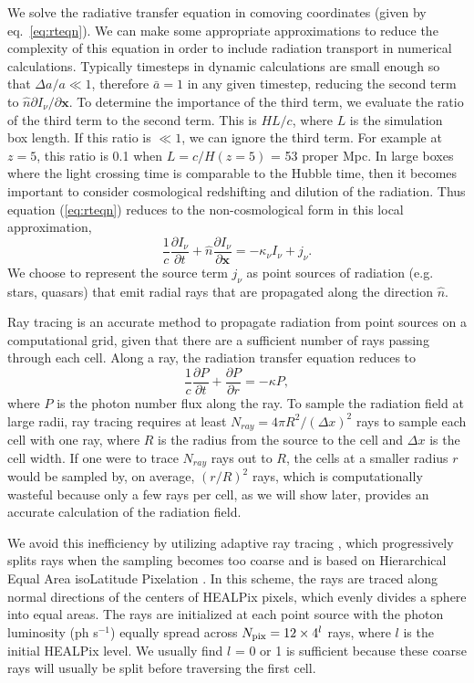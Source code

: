 We solve the radiative transfer equation in comoving coordinates (given by eq.~\ref{eq:rteqn}).
We can make some appropriate approximations to reduce the complexity
of this equation in order to include radiation transport
in numerical calculations.  Typically timesteps in dynamic
calculations are small enough so that $\Delta a/a \ll 1$, therefore
$\bar{a} = 1$ in any given timestep, reducing the second term to
$\hat{n} \partial I_\nu/\partial \mathbf{x}$.  To determine the
importance of the third term, we evaluate the ratio of the third term
to the second term.  This is $HL/c$, where $L$ is the simulation box
length.  If this ratio is $\ll 1$, we can ignore the third term.  For
example at $z=5$, this ratio is 0.1 when $L = c/H(z=5)$ = 53 proper
Mpc.  In large boxes where the light crossing time is comparable to
the Hubble time, then it becomes important to consider cosmological
redshifting and dilution of the radiation.  Thus equation
(\ref{eq:rteqn}) reduces to the non-cosmological form in this local
approximation,
%
\begin{equation}
  \frac{1}{c} \frac{\partial I_\nu}{\partial t} + 
  \hat{n} \frac{\partial I_\nu}{\partial \mathbf{x}} =
  -\kappa_\nu I_\nu + j_\nu .
\end{equation}
%
We choose to represent the source term $j_\nu$ as point sources of
radiation (e.g. stars, quasars) that emit radial rays that are
propagated along the direction $\hat{n}$.

Ray tracing is an accurate method to propagate radiation from point
sources on a computational grid, given that there are a sufficient
number of rays passing through each cell.  Along a ray, the radiation
transfer equation reduces to
%
\begin{equation}
\label{eqn:rtray}
\frac{1}{c} \frac{\partial P}{\partial t} + \frac{\partial P}{\partial
  r} = -\kappa P,
\end{equation}
where $P$ is the photon number flux along the ray.  To sample the
radiation field at large radii, ray tracing requires at least $N_{ray}
= 4\pi R^2 / (\Delta x)^2$ rays to sample each cell with one ray,
where $R$ is the radius from the source to the cell and $\Delta x$ is
the cell width.  If one were to trace $N_{ray}$ rays out to $R$, the
cells at a smaller radius $r$ would be sampled by, on average,
$(r/R)^2$ rays, which is computationally wasteful because only a few
rays per cell, as we will show later, provides an accurate calculation
of the radiation field.

We avoid this inefficiency by utilizing adaptive ray tracing
\citep{Abel02_RT}, which progressively splits rays when the sampling
becomes too coarse and is based on Hierarchical Equal Area isoLatitude
Pixelation \citep[HEALPix;][]{HEALPix}.  In this scheme, the rays are
traced along normal directions of the centers of HEALPix pixels, which
evenly divides a sphere into equal areas.  The rays are initialized at
each point source with the photon luminosity (ph s$^{-1}$) equally
spread across $N_{\rm pix} = 12 \times 4^l$ rays, where $l$ is the
initial HEALPix level.  We usually find $l$ = 0 or 1 is sufficient
because these coarse rays will usually be split before traversing
the first cell.


